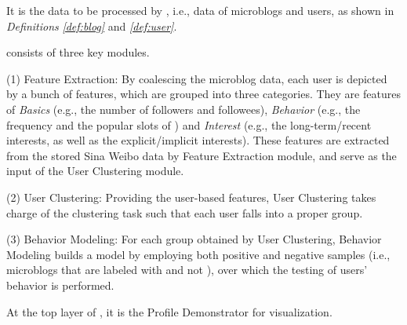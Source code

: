  It is the data to be processed by \sys{}, i.e., data of microblogs and users, as shown in \textit{Definitions} \textit{\ref{def:blog}} and \textit{\ref{def:user}}.

\sys{} consists of three key modules.

	\stab(1)  Feature Extraction: By coalescing the microblog data, each user is depicted by a bunch of features, which are grouped into three categories. They are features of \textit{Basics} (e.g., the number of followers and followees), \textit{Behavior} (e.g., the frequency and the popular slots of \retg{}) and \textit{Interest} (e.g., the long-term/recent interests, as well as the explicit/implicit interests). These features are extracted from the stored  Sina Weibo data by Feature Extraction module, and serve as the input of the User Clustering module.
	
	\stab(2)  User Clustering: Providing the user-based features, User Clustering takes charge of the clustering task such that each user falls into a proper group.
	
	\stab(3)  Behavior Modeling: For each group obtained by User Clustering, Behavior Modeling builds a  model by employing both positive and negative samples (i.e., microblogs that are labeled with \retd{} and not \retd{}), over which the testing of users' \retg{} behavior is performed.
	
 At the top layer of \sys{}, it is the Profile Demonstrator for visualization.


